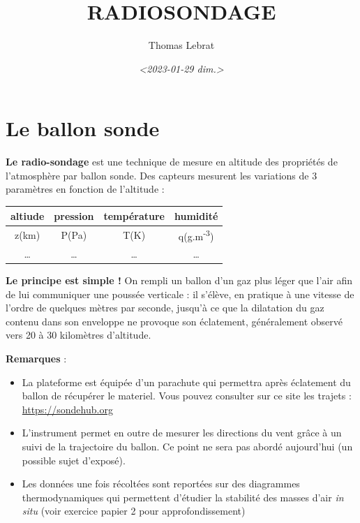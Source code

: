 \documentclass[letterpaper]{article}
\author{Thomas Lebrat}
\date{\textit{<2023-01-29 dim.>}}
\title{RADIOSONDAGE}
\begin{document}
\section{Le ballon sonde}
\label{sec:org6aaa7c0}

\textbf{\textbf{Le radio-sondage}} est une technique de mesure en altitude des propriétés de l'atmosphère par ballon sonde. Des capteurs mesurent les variations de 3 paramètres en fonction de l'altitude : 

\begin{table}[htbp]
\label{name}
\centering
\begin{tabular}{|c|c|c|c|}
altiude & pression & température & humidité\\
\hline
z(km) & P(Pa) & T(K) & q(g.m\textsuperscript{-3})\\
\ldots{} & \ldots{} & \ldots{} & \ldots{}\\
\end{tabular}
\end{table}


\textbf{\textbf{Le principe est simple !}} On rempli un ballon d’un gaz plus léger que l’air afin de lui communiquer une poussée verticale : il s’élève, en pratique à une vitesse de l’ordre de quelques mètres par seconde, jusqu'à ce que la dilatation du gaz contenu dans son enveloppe ne provoque son éclatement, généralement observé vers 20 à 30 kilomètres d'altitude.

\bigskip


\bigskip

\textbf{\textbf{Remarques}} :

\begin{itemize}
\item La plateforme est équipée d'un parachute qui permettra après éclatement du ballon de récupérer le materiel. Vous pouvez consulter sur ce site les trajets : \url{https://sondehub.org}
\end{itemize}


\begin{itemize}
\item L'instrument permet en outre de mesurer les directions du vent grâce à un suivi de la trajectoire du ballon. Ce point ne sera pas abordé aujourd'hui (un possible sujet d'exposé).

\item Les données une fois récoltées sont reportées sur des diagrammes thermodynamiques qui permettent d'étudier la stabilité des masses d'air \emph{in situ} (voir exercice papier 2 pour approfondissement)
\end{itemize}
\end{document}
